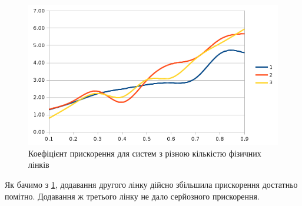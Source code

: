 \begin{figure}[h]
  \begin{center}
    \includegraphics[width=\textwidth]{res/links.png}
  \end{center}
  \caption{Коефіцієнт прискорення для систем з різною кількістю фізичних лінків}
\label{fig:links}
\end{figure}

Як бачимо з \ref{fig:links}, додавання другого лінку дійсно збільшила прискорення достатньо помітно. Додавання ж третього лінку не дало серйозного прискорення.
